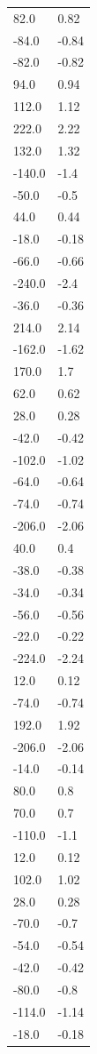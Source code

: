 \begin{longtable}{ll}
82.0 & 0.82 \\
-84.0 & -0.84 \\
-82.0 & -0.82 \\
94.0 & 0.94 \\
112.0 & 1.12 \\
222.0 & 2.22 \\
132.0 & 1.32 \\
-140.0 & -1.4 \\
-50.0 & -0.5 \\
44.0 & 0.44 \\
-18.0 & -0.18 \\
-66.0 & -0.66 \\
-240.0 & -2.4 \\
-36.0 & -0.36 \\
214.0 & 2.14 \\
-162.0 & -1.62 \\
170.0 & 1.7 \\
62.0 & 0.62 \\
28.0 & 0.28 \\
-42.0 & -0.42 \\
-102.0 & -1.02 \\
-64.0 & -0.64 \\
-74.0 & -0.74 \\
-206.0 & -2.06 \\
40.0 & 0.4 \\
-38.0 & -0.38 \\
-34.0 & -0.34 \\
-56.0 & -0.56 \\
-22.0 & -0.22 \\
-224.0 & -2.24 \\
12.0 & 0.12 \\
-74.0 & -0.74 \\
192.0 & 1.92 \\
-206.0 & -2.06 \\
-14.0 & -0.14 \\
80.0 & 0.8 \\
70.0 & 0.7 \\
-110.0 & -1.1 \\
12.0 & 0.12 \\
102.0 & 1.02 \\
28.0 & 0.28 \\
-70.0 & -0.7 \\
-54.0 & -0.54 \\
-42.0 & -0.42 \\
-80.0 & -0.8 \\
-114.0 & -1.14 \\
-18.0 & -0.18 \\

\end{longtable}
